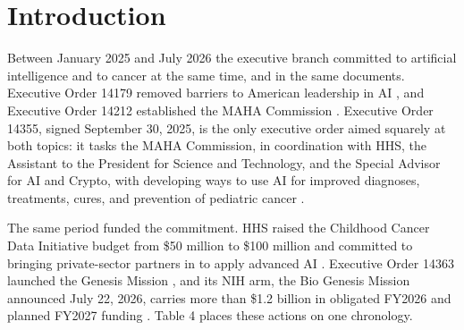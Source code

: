 \section{Introduction}
\label{sec:introduction}

Between January 2025 and July 2026 the executive branch committed to artificial
intelligence and to cancer at the same time, and in the same documents. Executive
Order 14179 removed barriers to American leadership in AI \cite{eo14179}, and
Executive Order 14212 established the MAHA Commission \cite{eo14212}. Executive
Order 14355, signed September 30, 2025, is the only executive order aimed
squarely at both topics: it tasks the MAHA Commission, in coordination with HHS,
the Assistant to the President for Science and Technology, and the Special
Advisor for AI and Crypto, with developing ways to use AI for improved
diagnoses, treatments, cures, and prevention of pediatric cancer
\cite{eo14355, eo14355app, akin_eo14355}.



The same period funded the commitment. HHS raised the Childhood Cancer Data
Initiative budget from \$50 million to \$100 million and committed to bringing
private-sector partners in to apply advanced AI \cite{ccdidoubling_nih}.
Executive Order 14363 launched the Genesis Mission \cite{eo14363}, and its NIH
arm, the Bio Genesis Mission announced July 22, 2026, carries more than \$1.2
billion in obligated FY2026 and planned FY2027 funding
\cite{biogenesis_nih, hpcwire_genesis}. Table 4 places these actions on one
chronology.

